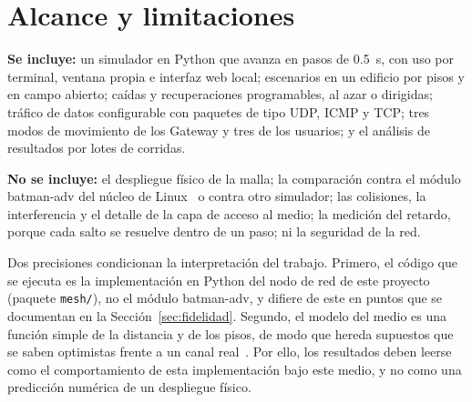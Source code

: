 \section{Alcance y limitaciones}
\label{sec:alcance}

\textbf{Se incluye:} un simulador en Python que avanza en pasos de 0.5~s, con
uso por terminal, ventana propia e interfaz web local; escenarios en un edificio
por pisos y en campo abierto; caídas y recuperaciones programables, al azar o
dirigidas; tráfico de datos configurable con paquetes de tipo UDP, ICMP y TCP;
tres modos de movimiento de los Gateway y tres de los usuarios; y el análisis de
resultados por lotes de corridas.

\textbf{No se incluye:} el despliegue físico de la malla; la comparación contra
el módulo batman-adv del núcleo de Linux~\cite{OpenMesh2024Batmanadv} o contra
otro simulador; las colisiones, la interferencia y el detalle de la capa de
acceso al medio; la medición del retardo, porque cada salto se resuelve dentro de
un paso; ni la seguridad de la red.

Dos precisiones condicionan la interpretación del trabajo. Primero, el código
que se ejecuta es la implementación en Python del nodo de red de este proyecto
(paquete \texttt{mesh/}), no el módulo batman-adv, y difiere de este en puntos
que se documentan en la Sección~\ref{sec:fidelidad}. Segundo, el modelo del medio
es una función simple de la distancia y de los pisos, de modo que hereda
supuestos que se saben optimistas frente a un canal
real~\cite{Kotz2004Assumptions}. Por ello, los resultados deben leerse como el
comportamiento de esta implementación bajo este medio, y no como una predicción
numérica de un despliegue físico.
